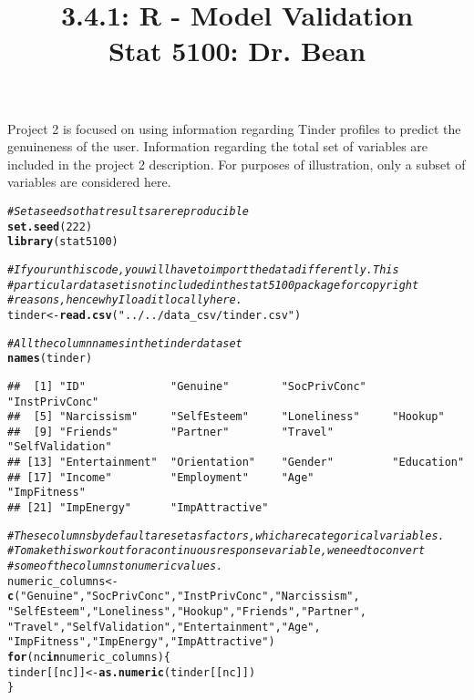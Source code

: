 \documentclass{article}\usepackage[]{graphicx}\usepackage[]{color}
\makeatletter
\newcommand{\hlnum}[1]{\textcolor[rgb]{0.686,0.059,0.569}{#1}}%
\newcommand{\hlstr}[1]{\textcolor[rgb]{0.192,0.494,0.8}{#1}}%
\newcommand{\hlcom}[1]{\textcolor[rgb]{0.678,0.584,0.686}{\textit{#1}}}%
\newcommand{\hlstd}[1]{\textcolor[rgb]{0.345,0.345,0.345}{#1}}%
\newcommand{\hlkwa}[1]{\textcolor[rgb]{0.161,0.373,0.58}{\textbf{#1}}}%
\newcommand{\hlkwb}[1]{\textcolor[rgb]{0.69,0.353,0.396}{#1}}%
\newcommand{\hlkwd}[1]{\textcolor[rgb]{0.737,0.353,0.396}{\textbf{#1}}}%
\newenvironment{kframe}{%
 \def\at@end@of@kframe{}%
 \ifinner\ifhmode%
  \def\at@end@of@kframe{\end{minipage}}%
  \begin{minipage}{\columnwidth}%
 \fi\fi%
 \def\FrameCommand##1{\hskip\@totalleftmargin \hskip-\fboxsep
 \colorbox{shadecolor}{##1}\hskip-\fboxsep
     \hskip-\linewidth \hskip-\@totalleftmargin \hskip\columnwidth}%
 \MakeFramed {\advance\hsize-\width
   \@totalleftmargin\z@ \linewidth\hsize
   \@setminipage}}%
 {\par\unskip\endMakeFramed%
 \at@end@of@kframe}
\newenvironment{knitrout}{}{} %
\makeatother
\begin{document}
\title{%
  3.4.1: R - Model Validation \\
  \smallskip
  \large Stat 5100: Dr. Bean
}
\date{}

\maketitle

Project 2 is focused on using information regarding Tinder profiles
to predict the genuineness of the user. Information regarding the total
set of variables are included in the project 2 description. For purposes
of illustration, only a subset of variables are considered here.

\begin{knitrout}
\color{fgcolor}\begin{kframe}
\begin{alltt}
\hlcom{# Set a seed so that results are reproducible}
\hlkwd{set.seed}\hlstd{(}\hlnum{222}\hlstd{)}
\hlkwd{library}\hlstd{(stat5100)}

\hlcom{# If you run this code, you will have to import the data differently. This}
\hlcom{# particular dataset is not included in the stat5100 package for copyright}
\hlcom{# reasons, hence why I load it locally here.}
\hlstd{tinder} \hlkwb{<-} \hlkwd{read.csv}\hlstd{(}\hlstr{"../../data_csv/tinder.csv"}\hlstd{)}

\hlcom{# All the column names in the tinder dataset}
\hlkwd{names}\hlstd{(tinder)}
\end{alltt}
\begin{verbatim}
##  [1] "ID"             "Genuine"        "SocPrivConc"    "InstPrivConc"  
##  [5] "Narcissism"     "SelfEsteem"     "Loneliness"     "Hookup"        
##  [9] "Friends"        "Partner"        "Travel"         "SelfValidation"
## [13] "Entertainment"  "Orientation"    "Gender"         "Education"     
## [17] "Income"         "Employment"     "Age"            "ImpFitness"    
## [21] "ImpEnergy"      "ImpAttractive"
\end{verbatim}
\begin{alltt}
\hlcom{# These columns by default are set as factors, which are categorical variables.}
\hlcom{# To make this work out for a continuous response variable, we need to convert}
\hlcom{# some of the columns to numeric values.}
\hlstd{numeric_columns} \hlkwb{<-} \hlkwd{c}\hlstd{(}\hlstr{"Genuine"}\hlstd{,} \hlstr{"SocPrivConc"}\hlstd{,} \hlstr{"InstPrivConc"}\hlstd{,} \hlstr{"Narcissism"}\hlstd{,}
                     \hlstr{"SelfEsteem"}\hlstd{,} \hlstr{"Loneliness"}\hlstd{,} \hlstr{"Hookup"}\hlstd{,} \hlstr{"Friends"}\hlstd{,} \hlstr{"Partner"}\hlstd{,}
                     \hlstr{"Travel"}\hlstd{,} \hlstr{"SelfValidation"}\hlstd{,} \hlstr{"Entertainment"}\hlstd{,} \hlstr{"Age"}\hlstd{,}
                     \hlstr{"ImpFitness"}\hlstd{,} \hlstr{"ImpEnergy"}\hlstd{,} \hlstr{"ImpAttractive"}\hlstd{)}
\hlkwa{for} \hlstd{(nc} \hlkwa{in} \hlstd{numeric_columns) \{}
  \hlstd{tinder[[nc]]} \hlkwb{<-} \hlkwd{as.numeric}\hlstd{(tinder[[nc]])}
\hlstd{\}}
\end{alltt}



\end{kframe}
\end{knitrout}
\end{document}
